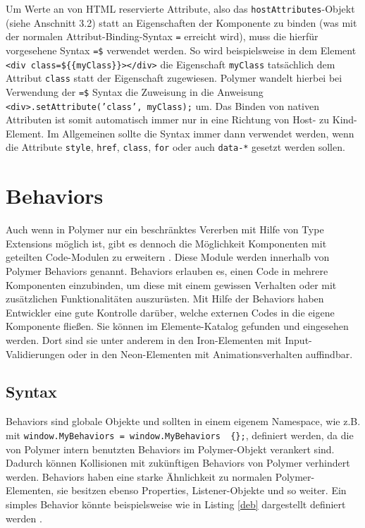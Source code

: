 Um Werte an von \ac{HTML} reservierte Attribute, also das \texttt{hostAttributes}-Objekt (siehe Anschnitt 3.2) statt an Eigenschaften der Komponente zu binden (was mit der normalen Attribut-Binding-Syntax \texttt{=} erreicht wird), muss die hierfür vorgesehene Syntax \texttt{=\$} verwendet werden. So wird beispielsweise in dem Element \texttt{\textless{}div\ class=\$\dq \{\{myClass\}\}\dq\textgreater{}\textless{}/div\textgreater{}} die Eigenschaft \texttt{myClass} tatsächlich dem Attribut \texttt{class} statt der Eigenschaft zugewiesen. Polymer wandelt hierbei bei Verwendung der \texttt{=\$} Syntax die Zuweisung in die Anweisung \texttt{\textless{}div\textgreater{}.setAttribute('class',\ myClass);} um. Das Binden von nativen Attributen ist somit automatisch immer nur in eine Richtung von Host- zu Kind-Element. Im Allgemeinen sollte die Syntax immer dann verwendet werden, wenn die Attribute \texttt{style}, \texttt{href}, \texttt{class}, \texttt{for} oder auch \texttt{data-*} gesetzt werden sollen.


\section{Behaviors}\label{behaviors}

Auch wenn in Polymer nur ein beschränktes Vererben mit Hilfe von Type Extensions möglich ist, gibt es dennoch die Möglichkeit Komponenten mit geteilten Code-Modulen zu erweitern \cite{citeulike:13915080}. Diese Module werden innerhalb von Polymer Behaviors genannt. Behaviors erlauben es, einen Code in mehrere Komponenten einzubinden, um diese mit einem gewissen Verhalten oder mit zusätzlichen Funktionalitäten auszurüsten. Mit Hilfe der Behaviors haben Entwickler eine gute Kontrolle darüber, welche externen Codes in die eigene Komponente fließen. Sie können im Elemente-Katalog gefunden und eingesehen werden. Dort sind sie unter anderem in den Iron-Elementen mit Input-Validierungen oder in den Neon-Elementen mit Animationsverhalten auffindbar.


\subsection{Syntax}\label{syntax}

Behaviors sind globale Objekte und sollten in einem eigenem Namespace, wie z.B. mit \texttt{window.MyBehaviors\ =\ window.MyBehaviors\ \textbar{}\textbar{}\ \{\};}, definiert werden, da die von Polymer intern benutzten Behaviors im
Polymer-Objekt verankert sind. Dadurch können Kollisionen mit zukünftigen Behaviors von Polymer verhindert werden. Behaviors haben eine starke Ähnlichkeit zu normalen Polymer-Elementen, sie besitzen ebenso Properties, Listener-Objekte und so weiter. Ein simples Behavior könnte beispielsweise wie in Listing \ref{deb} dargestellt definiert werden \cite{citeulike:13915079}.

